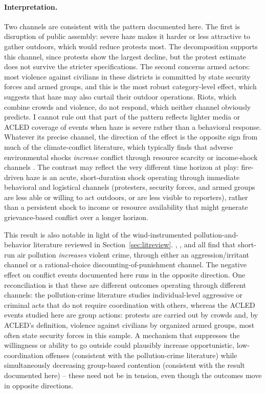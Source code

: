 \documentclass[12pt]{article}
\begin{document}
\paragraph{Interpretation.} Two channels are consistent with the pattern documented here. The first is disruption of public assembly: severe haze makes it harder or less attractive to gather outdoors, which would reduce protests most. The decomposition supports this channel, since protests show the largest decline, but the protest estimate does not survive the stricter specifications. The second concerns armed actors: most violence against civilians in these districts is committed by state security forces and armed groups, and this is the most robust category-level effect, which suggests that haze may also curtail their outdoor operations. Riots, which combine crowds and violence, do not respond, which neither channel obviously predicts. I cannot rule out that part of the pattern reflects lighter media or ACLED coverage of events when haze is severe rather than a behavioral response. Whatever its precise channel, the direction of the effect is the opposite sign from much of the climate-conflict literature, which typically finds that adverse environmental shocks \emph{increase} conflict through resource scarcity or income-shock channels \citep{hsiang2013quantifying,burkehsiangmiguel2015,miguelsatyanathsergenti2004}. The contrast may reflect the very different time horizon at play: fire-driven haze is an acute, short-duration shock operating through immediate behavioral and logistical channels (protesters, security forces, and armed groups are less able or willing to act outdoors, or are less visible to reporters), rather than a persistent shock to income or resource availability that might generate grievance-based conflict over a longer horizon.

This result is also notable in light of the wind-instrumented pollution-and-behavior literature reviewed in Section~\ref{sec:litreview}. \citet{herrnstadt2021}, \citet{bondyrothsager2020}, and \citet{burkhardt2019} all find that short-run air pollution \emph{increases} violent crime, through either an aggression/irritant channel or a rational-choice discounting-of-punishment channel. The negative effect on conflict events documented here runs in the opposite direction. One reconciliation is that these are different outcomes operating through different channels: the pollution-crime literature studies individual-level aggressive or criminal acts that do not require coordination with others, whereas the ACLED events studied here are group actions: protests are carried out by crowds and, by ACLED's definition, violence against civilians by organized armed groups, most often state security forces in this sample. A mechanism that suppresses the willingness or ability to go outside could plausibly increase opportunistic, low-coordination offenses (consistent with the pollution-crime literature) while simultaneously decreasing group-based contention (consistent with the result documented here) -- these need not be in tension, even though the outcomes move in opposite directions.
\end{document}
